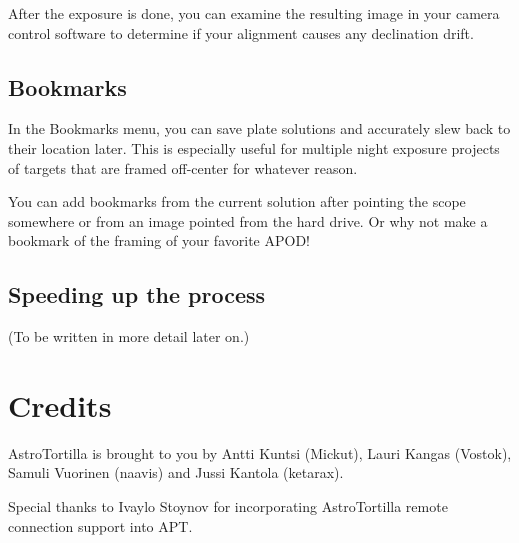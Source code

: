 \documentclass[english]{article}
\begin{document}
After the exposure is done, you can examine the resulting image in your camera 
control software to determine if your alignment causes any declination drift.

\subsection{Bookmarks}

In the Bookmarks menu, you can save plate solutions and accurately slew back to their location later. 
This is especially useful for multiple night exposure projects of targets that are framed off-center for whatever reason.

You can add bookmarks from the current solution after pointing the scope somewhere or from an image pointed from the hard drive. Or why not make a bookmark of the framing of your favorite APOD!

\subsection{Speeding up the process}

(To be written in more detail later on.)

\section{Credits}

AstroTortilla is brought to you by Antti Kuntsi (Mickut), Lauri Kangas (Vostok), Samuli Vuorinen (naavis) and Jussi Kantola (ketarax). 

Special thanks to Ivaylo Stoynov for incorporating AstroTortilla remote connection support into APT.

\end{document}
